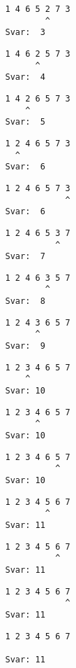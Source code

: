 { \begin{verbatim}
                1 4 6 5 2 7 3
                        ^
                Svar:  3
\end{verbatim}}
{ \begin{verbatim}
                1 4 6 2 5 7 3
                      ^
                Svar:  4
\end{verbatim}}
{ \begin{verbatim}
                1 4 2 6 5 7 3
                    ^
                Svar:  5
\end{verbatim}}
{ \begin{verbatim}
                1 2 4 6 5 7 3
                  ^
                Svar:  6
\end{verbatim}}
{ \begin{verbatim}
                1 2 4 6 5 7 3
                            ^
                Svar:  6
\end{verbatim}}
{ \begin{verbatim}
                1 2 4 6 5 3 7
                          ^
                Svar:  7
\end{verbatim}}
{ \begin{verbatim}
                1 2 4 6 3 5 7
                        ^
                Svar:  8
\end{verbatim}}
{ \begin{verbatim}
                1 2 4 3 6 5 7
                      ^
                Svar:  9
\end{verbatim}}
{ \begin{verbatim}
                1 2 3 4 6 5 7
                    ^
                Svar: 10
\end{verbatim}}
{ \begin{verbatim}
                1 2 3 4 6 5 7
                      ^
                Svar: 10
\end{verbatim}}
{ \begin{verbatim}
                1 2 3 4 6 5 7
                          ^
                Svar: 10
\end{verbatim}}
{ \begin{verbatim}
                1 2 3 4 5 6 7
                        ^
                Svar: 11
\end{verbatim}}
{ \begin{verbatim}
                1 2 3 4 5 6 7
                          ^
                Svar: 11
\end{verbatim}}
{ \begin{verbatim}
                1 2 3 4 5 6 7
                            ^
                Svar: 11
\end{verbatim}}
{ \begin{verbatim}
                1 2 3 4 5 6 7

                Svar: 11
\end{verbatim}}

